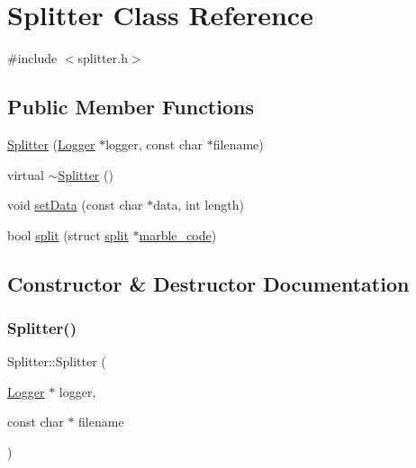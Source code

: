 \hypertarget{classSplitter}{}\section{Splitter Class Reference}
\label{classSplitter}


{\ttfamily \#include $<$splitter.\+h$>$}

\subsection*{Public Member Functions}
\begin{DoxyCompactItemize}
\item 
\hyperlink{classSplitter_a903043011add23292e7731192a48e768}{Splitter} (\hyperlink{classLogger}{Logger} $\ast$logger, const char $\ast$filename)
\item 
virtual \hyperlink{classSplitter_a39a9ddc7baf2616717677effae5ca547}{$\sim$\+Splitter} ()
\item 
void \hyperlink{classSplitter_a63334af48b3c284b4852af96085a949f}{set\+Data} (const char $\ast$data, int length)
\item 
bool \hyperlink{classSplitter_aec64e7219fdb1aaf94dfcf6b40a03efa}{split} (struct \hyperlink{structsplit}{split} $\ast$\hyperlink{structmarble__code}{marble\+\_\+code})
\end{DoxyCompactItemize}


\subsection{Constructor \& Destructor Documentation}
\mbox{\label{classSplitter_a903043011add23292e7731192a48e768}} 
\subsubsection{\texorpdfstring{Splitter()}{Splitter()}}
{\footnotesize\ttfamily Splitter\+::\+Splitter (\begin{DoxyParamCaption}\item[{\hyperlink{classLogger}{Logger} $\ast$}]{logger,  }\item[{const char $\ast$}]{filename }\end{DoxyParamCaption})}

\mbox{\label{classSplitter_a39a9ddc7baf2616717677effae5ca547}} 
